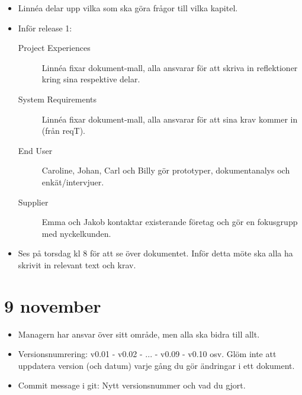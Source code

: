 \documentclass[10pt,a4paper]{article}
\begin{document}
\begin{itemize}
\item Linnéa delar upp vilka som ska göra frågor till vilka kapitel.
\item Inför release 1:
\begin{description}
\item[Project Experiences] Linnéa fixar dokument-mall, alla ansvarar för att skriva in reflektioner kring sina respektive delar.
\item[System Requirements] Linnéa fixar dokument-mall, alla ansvarar för att sina krav kommer in (från reqT).
\item[End User] Caroline, Johan, Carl och Billy gör prototyper, dokumentanalys och enkät/intervjuer.
\item[Supplier] Emma och Jakob kontaktar existerande företag och gör en fokusgrupp med nyckelkunden.
\end{description}
\item Ses på torsdag kl 8 för att se över dokumentet. Inför detta möte ska alla ha skrivit in relevant text och krav.
\end{itemize}

\section*{9 november}
\begin{itemize}
\item Managern har ansvar över sitt område, men alla ska bidra till allt.
\item Versionsnumrering: v0.01 - v0.02 - ... - v0.09 - v0.10 osv. Glöm inte att uppdatera version (och datum) varje gång du gör ändringar i ett dokument.
\item Commit message i git: Nytt versionsnummer och vad du gjort.
\end{itemize}
\end{document}
